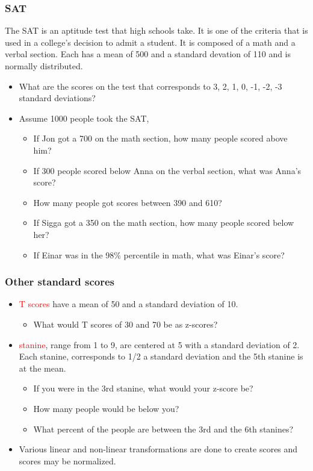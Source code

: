 \documentclass[dvipsnames]{beamer}\usepackage[]{graphicx}\usepackage[]{color}
\begin{document}
\begin{frame}
  \frametitle{SAT}
  
  The SAT is an aptitude test that high schools take. It is one of the criteria that is used in a college's decision to admit a student. It is composed of a math and a verbal section. Each has a mean of 500 and a standard devation of 110 and is normally distributed. 
  \begin{itemize}
  \item<1-> What are the scores on the test that corresponds to 3, 2, 1, 0, -1, -2, -3 standard deviations?
  \item<2-> Assume 1000 people took the SAT,
  \begin{itemize}
    \item<3-> If Jon got a 700 on the math section, how many people scored above him?
    \item<4-> If 300 people scored below Anna on the verbal section, what was Anna's score?
    \item<5-> How many people got scores between 390 and 610?
    \item<6-> If Sigga got a 350 on the math section, how many people scored below her?
    \item<7-> If Einar was in the 98\% percentile in math, what was Einar's score?
  \end{itemize}
  \end{itemize}
\end{frame}


\begin{frame}
\frametitle{Other standard scores}
\begin{itemize}
  \item<1-> \textcolor{red}{T scores} have a mean of 50 and a standard deviation of 10.
    \begin{itemize}
      \item<2-> What would T scores of 30 and 70 be as z-scores?
    \end{itemize}
    \item<3-> \textcolor{red}{stanine}, range from 1 to 9, are centered at 5 with a standard deviation of 2. Each stanine, corresponds to 1/2 a standard deviation and the 5th stanine is at the mean.
      \begin{itemize}
        \item<4-> If you were in the 3rd stanine, what would your z-score be?
        \item<5-> How many people would be below you?
        \item<6-> What percent of the people are between the 3rd and the 6th stanines?
      \end{itemize}
      \item<7-> Various linear and non-linear transformations are done to create scores and scores may be normalized.
\end{itemize}
\end{frame}
\end{document}
